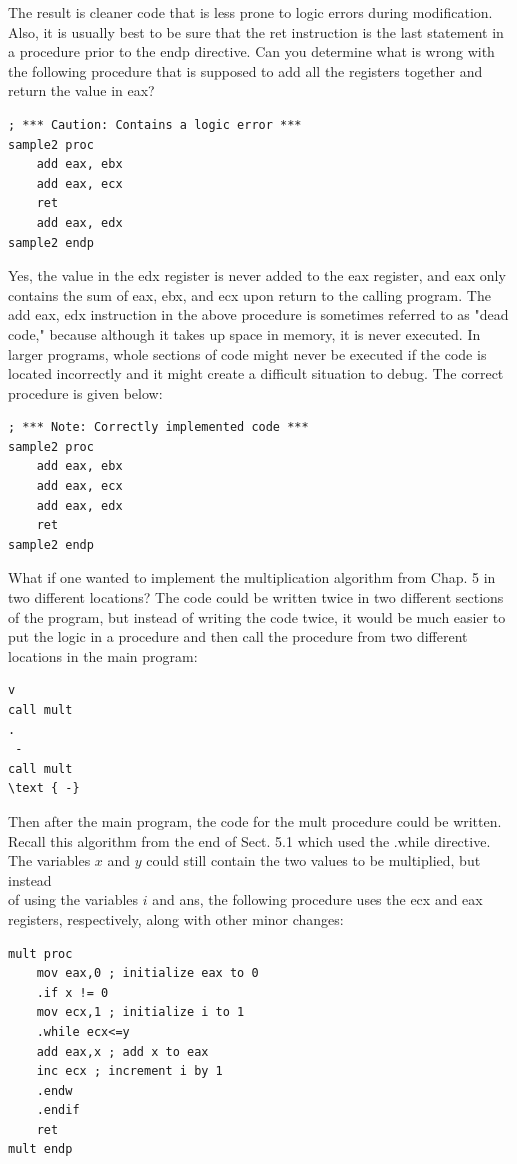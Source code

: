 \documentclass[10pt]{article}
\begin{document}
The result is cleaner code that is less prone to logic errors during modification. Also, it is usually best to be sure that the ret instruction is the last statement in a procedure prior to the endp directive. Can you determine what is wrong with the following procedure that is supposed to add all the registers together and return the value in eax?

\begin{verbatim}
; *** Caution: Contains a logic error ***
sample2 proc
    add eax, ebx
    add eax, ecx
    ret
    add eax, edx
sample2 endp
\end{verbatim}

Yes, the value in the edx register is never added to the eax register, and eax only contains the sum of eax, ebx, and ecx upon return to the calling program. The add eax, edx instruction in the above procedure is sometimes referred to as "dead code," because although it takes up space in memory, it is never executed. In larger programs, whole sections of code might never be executed if the code is located incorrectly and it might create a difficult situation to debug. The correct procedure is given below:

\begin{verbatim}
; *** Note: Correctly implemented code ***
sample2 proc
    add eax, ebx
    add eax, ecx
    add eax, edx
    ret
sample2 endp
\end{verbatim}

What if one wanted to implement the multiplication algorithm from Chap. 5 in two different locations? The code could be written twice in two different sections of the program, but instead of writing the code twice, it would be much easier to put the logic in a procedure and then call the procedure from two different locations in the main program:

\begin{verbatim}
v
call mult
.
 -
call mult
\text { -}
\end{verbatim}

Then after the main program, the code for the mult procedure could be written. Recall this algorithm from the end of Sect. 5.1 which used the .while directive. The variables $x$ and $y$ could still contain the two values to be multiplied, but instead\\
of using the variables $i$ and ans, the following procedure uses the ecx and eax registers, respectively, along with other minor changes:

\begin{verbatim}
mult proc
    mov eax,0 ; initialize eax to 0
    .if x != 0
    mov ecx,1 ; initialize i to 1
    .while ecx<=y
    add eax,x ; add x to eax
    inc ecx ; increment i by 1
    .endw
    .endif
    ret
mult endp
\end{verbatim}
\end{document}
